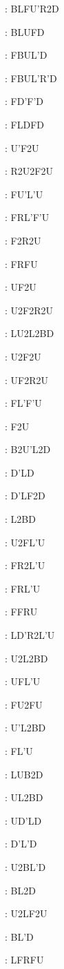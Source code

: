 \documentclass[9pt]{article}
\begin{document}
{\begin{multicols}{6}
: BLFU'R2D

: BLUFD

: FBUL'D

: FBUL'R'D

: FD'F'D

: FLDFD

: U'F2U

: R2U2F2U

: FU'L'U

: FRL'F'U

: F2R2U

: FRFU

: UF2U

: U2F2R2U

: LU2L2BD

: U2F2U

: UF2R2U

: FL'F'U

: F2U

: B2U'L2D

: D'LD

: D'LF2D

: L2BD

: U2FL'U

: FR2L'U

: FRL'U

: FFRU

: LD'R2L'U

: U2L2BD

: UFL'U

: FU2FU

: U'L2BD

: FL'U

: LUB2D

: UL2BD

: UD'LD

: D'L'D

: U2BL'D

: BL2D

: U2LF2U

: BL'D

: LFRFU


\end{multicols}}
\end{document}
